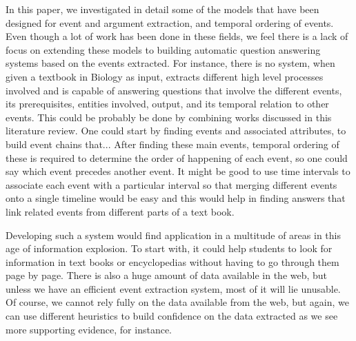 In this paper, we investigated in detail some of the models that have been designed for event and argument extraction, and temporal ordering of events. Even though a lot of work has been done in these fields, we feel there is a lack of focus on extending these models to building automatic question answering systems based on the events extracted. For instance, there is no system, when given a textbook in Biology as input, extracts different high level processes involved and is capable of answering questions that involve the different events, its prerequisites, entities involved, output, and its temporal relation to other events. This could be probably be done by combining works discussed in this literature review. One could start by finding events and associated attributes, to build event chains that... After finding these main events, temporal ordering of these is required to determine the order of happening of each event, so one could say which event precedes another event. It might be good to use time intervals to associate each event with a particular interval so that merging different events onto a single timeline would be easy and this would help in finding answers that link related events from different parts of a text book.

Developing such a system would find application in a multitude of areas in this age of information explosion. To start with, it could help students to look for information in text books or encyclopedias without having to go through them page by page. There is also a huge amount of data available in the web, but unless we have an efficient event extraction system, most of it will lie unusable. Of course, we cannot rely fully on the data available from the web, but again, we can use different heuristics to build confidence on the data extracted as we see more supporting evidence, for instance.